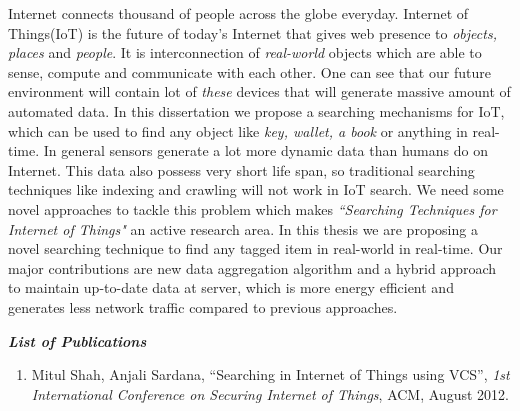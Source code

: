 \documentclass [a4paper,12pt]{book}
\begin{document}
Internet connects thousand of people across the globe everyday. Internet of Things(IoT) is the future of today's Internet that gives web presence to \emph{objects, places} and \emph{people}. It is interconnection of \emph{real-world} objects which are able to sense, compute and communicate with each other. One can see that our future environment will contain lot of \emph{these} devices that will generate massive amount of automated data. In this dissertation we propose a searching mechanisms for IoT, which can be used to find any object like \emph{key, wallet, a book} or anything in real-time. In general sensors generate a lot more dynamic data than humans do on Internet. This data also possess very short life span, so traditional searching techniques like indexing and crawling will not work in IoT search. We need some novel approaches to tackle this problem which makes \emph{``Searching Techniques for Internet of Things"} an active research area. In this thesis we are proposing a novel searching technique to find any tagged item in real-world in real-time. Our major contributions are new data aggregation algorithm and a hybrid approach to maintain up-to-date data at server, which is more energy efficient and generates less network traffic compared to previous approaches. 

\newpage
{}

\tableofcontents
\newpage
\listoffigures
\newpage
\mbox{}
\newpage
\listoftables

\newpage
{}
\begin{center}
\textbf{\emph{List of Publications}}
\end{center}
\vspace{0.8cm}
\begin{enumerate}[1. ]
\item Mitul Shah, Anjali Sardana, ``Searching in Internet of Things using VCS'', {\em 1st International Conference on Securing Internet of Things}, ACM, August 2012.
\end{enumerate}
\newpage
\setcounter{page}{1}
%
\end{document}
